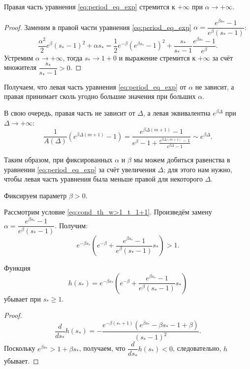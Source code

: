 %
\begin{proposition}
	Правая часть уравнения \eqref{eq:period_eq_exp} стремится к $+\infty$ при $\alpha \to +\infty$.
\end{proposition}
\begin{proof}
	Заменим в правой части уравнения \eqref{eq:period_eq_exp} $\alpha = \dfrac{e^{\beta s_*} - 1}{e^{\beta}(s_* - 1)}$:
	\begin{equation}
		\dfrac{\alpha^2}{2}e^{\beta}( s_* - 1)^2 + \alpha s_* = \dfrac{1}{2}e^{-\beta}(e^{\beta s_*} - 1)^2 + \dfrac{s_*}{s_* - 1}\dfrac{e^{\beta s_*} - 1}{e^{\beta}}.
	\end{equation}
	Устремим $\alpha \to +\infty$, тогда $s_* \to 1 + 0$ и выражение стремится к $+\infty$ за счёт множителя $\dfrac{s_*}{s_* - 1} > 0$.
\end{proof}

Получаем, что левая часть уравнения \eqref{eq:period_eq_exp} от $\alpha$ не зависит, а правая принимает сколь угодно большие значения при больших $\alpha$.

В свою очередь, правая часть не зависит от $\Delta$, а левая эквивалентна $e^{\beta\Delta}$ при $\Delta \to +\infty$:
$$
\dfrac{1}{A(\Delta)}\left(e^{\beta\Delta(m + 1)} - 1\right) = \dfrac{e^{\beta\Delta(m + 1)} - 1}{e^{\beta} - 1 + \frac{e^{\beta\Delta(m + 1)} - 1}{e^{\beta\Delta} - 1}} \sim e^{\beta \Delta}.
$$

Таким образом, при фиксированных $\alpha$ и $\beta$ мы можем добиться равенства в уравнении \eqref{eq:period_eq_exp} за счёт увеличения $\Delta$; для этого нам нужно, чтобы левая часть уравнения была меньше правой для некоторого $\Delta$.

Фиксируем параметр $\beta > 0$.

Рассмотрим условие \eqref{eq:cond_th_w>1_t_1+1}. Произведём замену $\alpha = \dfrac{e^{\beta s_*} - 1}{e^{\beta}(s_* - 1)}$. Получим: 
\begin{equation}
	e^{-\beta  s_*} \left(e^{-\beta} + \frac{e^{\beta s_*} - 1}{e^{\beta}(s_* - 1)}s_*\right) > 1.
\end{equation}
%

\begin{proposition}
	Функция 
	\begin{equation}
		h(s_*) = e^{-\beta  s_*} \left(e^{-\beta} + \frac{e^{\beta s_*} - 1}{e^{\beta}(s_* - 1)}s_*\right)
	\end{equation}
	убывает при $s_* \geqslant 1$.
\end{proposition}
%
\begin{proof}
	\begin{equation}
		\dfrac{d}{ds_*}h(s_*) = -\dfrac{e^{-\beta(s_* + 1)} (e^{\beta s_*} - \beta s_* - 1 + \beta)}{(s_* - 1)^2}.
	\end{equation}
	Поскольку $e^{\beta s_*} > 1 + \beta s_*$, получаем, что $\dfrac{d}{ds_*}h(s_*) < 0$, следовательно, $h$ убывает.
\end{proof}

